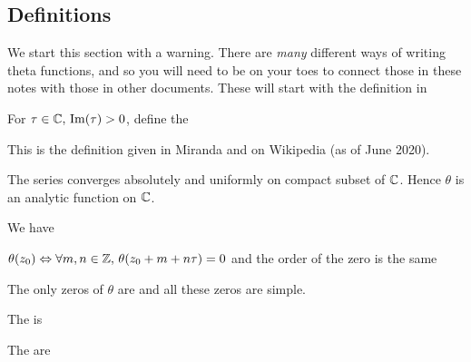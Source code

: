 \documentclass{article}
\begin{document}
\subsection{Definitions}
We start this section with a warning. There are \emph{many} different ways of writing theta functions, and so you will need to be on your toes to connect those in these notes with those in other documents. These will start with the definition in 

\begin{definition}
	For $\tau \in \mathbb{C}, \, \operatorname{Im}(\tau)>0$, define the  
\end{definition}

\begin{remark}
	This is the definition given in Miranda and on Wikipedia (as of June 2020). 
\end{remark}

\begin{prop}
	The series converges absolutely and uniformly on compact subset of $\mathbb{C}$. Hence $\theta$ is an analytic function on $\mathbb{C}$. 
\end{prop}

\begin{prop}
	We have 
\end{prop}

\begin{corollary}
	$\theta(z_0) \Leftrightarrow \forall m,n \in \mathbb{Z}, \, \theta(z_0 + m + n\tau)=0$ and the order of the zero is the same
\end{corollary}

\begin{prop}
	The only zeros of $\theta$ are 
and all these zeros are simple. 
\end{prop}

\begin{definition}
	The  is 
\end{definition}

\begin{definition}
	The  are 
\end{definition}
\end{document}
